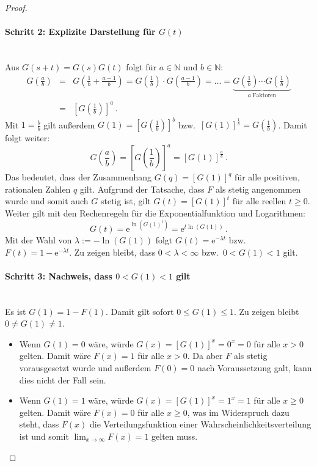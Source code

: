 \documentclass[a4paper,11pt,oneside]{article}
\theoremstyle{definition}
\begin{document}
\begin{proof}
\paragraph{Schritt 2: Explizite Darstellung für $G(t)$}~\\
Aus $G(s+t)=G(s)G(t)$ folgt für $a\in\mathbb{N}$ und $b\in\mathbb{N}$:
\begin{eqnarray*}
G\left(\frac{a}{b}\right)&=&
G\left(\frac{1}{b}+\frac{a-1}{b}\right)=
G\left(\frac{1}{b}\right)\cdot G\left(\frac{a-1}{b}\right)=
\ldots=
\underbrace{G\left(\frac{1}{b}\right)\cdots G\left(\frac{1}{b}\right)}_{a~\textrm{Faktoren}}\\
&=&\left[G\left(\frac{1}{b}\right)\right]^a\,.
\end{eqnarray*}
Mit $1=\frac{b}{b}$ gilt außerdem $G(1)=\left[G\left(\frac{1}{b}\right)\right]^b$ bzw.\ $\left[G(1)\right]^{\frac{1}{b}}=G\left(\frac{1}{b}\right)$.
Damit folgt weiter:
$$
G\left(\frac{a}{b}\right)=
\left[G\left(\frac{1}{b}\right)\right]^a=
\left[G(1)\right]^{\frac{a}{b}}\,.
$$
Das bedeutet, dass der Zusammenhang $G(q)=[G(1)]^q$ für alle positiven, rationalen Zahlen $q$ gilt. Aufgrund der Tatsache, dass $F$ als stetig angenommen wurde und somit auch $G$ stetig ist, gilt $G(t)=[G(1)]^t$ für alle reellen $t\ge0$. Weiter gilt mit den Rechenregeln für die Exponentialfunktion und Logarithmen:
$$
G(t)=
\mathrm{e}^{\ln\left(G(1)^t\right)}=
\mathrm{e}^{t\ln(G(1))}\,.
$$
Mit der Wahl von $\lambda:=-\ln(G(1))$ folgt $G(t)=\mathrm{e}^{-\lambda t}$ bzw.\ $F(t)=1-\mathrm{e}^{-\lambda t}$.
Zu zeigen bleibt, dass $0<\lambda<\infty$ bzw.\ $0<G(1)<1$ gilt.

\paragraph{Schritt 3: Nachweis, dass $0<G(1)<1$ gilt}~\\
Es ist $G(1)=1-F(1)$. Damit gilt sofort $0\le G(1)\le1$. Zu zeigen bleibt $0\neq G(1)\neq1$.
\begin{itemize}
\item
Wenn $G(1)=0$ wäre, würde $G(x)=\left[G(1)\right]^x=0^x=0$ für alle $x>0$ gelten. Damit wäre $F(x)=1$ für alle $x>0$. Da aber $F$ als stetig vorausgesetzt wurde und außerdem $F(0)=0$ nach Voraussetzung galt, kann dies nicht der Fall sein.
\item
Wenn $G(1)=1$ wäre, würde $G(x)=\left[G(1)\right]^x=1^x=1$ für alle $x\ge0$ gelten. Damit wäre $F(x)=0$ für alle $x\ge0$, was im Widerspruch dazu steht, dass $F(x)$ die Verteilungsfunktion einer Wahrscheinlichkeitsverteilung ist und somit $\lim_{x\to\infty}F(x)=1$ gelten muss.
\end{itemize}
\end{proof}
\end{document}

